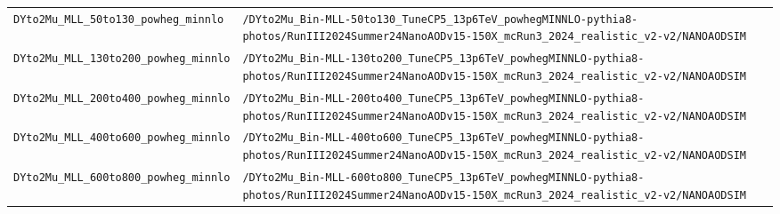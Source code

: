 \begin{longtable}{@{}>{\RaggedRight\arraybackslash}p{} >{\RaggedRight\arraybackslash}p{}@{}}
\addlinespace[2pt]
\texttt{DYto2Mu\_\allowbreak{}MLL\_\allowbreak{}50to130\_\allowbreak{}powheg\_\allowbreak{}minnlo} & \texttt{/\allowbreak{}DYto2Mu\_\allowbreak{}Bin-\allowbreak{}MLL-\allowbreak{}50to130\_\allowbreak{}TuneCP5\_\allowbreak{}13p6TeV\_\allowbreak{}powhegMINNLO-\allowbreak{}pythia8-\allowbreak{}photos/\allowbreak{}RunIII2024Summer24NanoAODv15-\allowbreak{}150X\_\allowbreak{}mcRun3\_\allowbreak{}2024\_\allowbreak{}realistic\_\allowbreak{}v2-\allowbreak{}v2/\allowbreak{}NANOAODSIM} \\
\addlinespace[2pt]
\texttt{DYto2Mu\_\allowbreak{}MLL\_\allowbreak{}130to200\_\allowbreak{}powheg\_\allowbreak{}minnlo} & \texttt{/\allowbreak{}DYto2Mu\_\allowbreak{}Bin-\allowbreak{}MLL-\allowbreak{}130to200\_\allowbreak{}TuneCP5\_\allowbreak{}13p6TeV\_\allowbreak{}powhegMINNLO-\allowbreak{}pythia8-\allowbreak{}photos/\allowbreak{}RunIII2024Summer24NanoAODv15-\allowbreak{}150X\_\allowbreak{}mcRun3\_\allowbreak{}2024\_\allowbreak{}realistic\_\allowbreak{}v2-\allowbreak{}v2/\allowbreak{}NANOAODSIM} \\
\addlinespace[2pt]
\texttt{DYto2Mu\_\allowbreak{}MLL\_\allowbreak{}200to400\_\allowbreak{}powheg\_\allowbreak{}minnlo} & \texttt{/\allowbreak{}DYto2Mu\_\allowbreak{}Bin-\allowbreak{}MLL-\allowbreak{}200to400\_\allowbreak{}TuneCP5\_\allowbreak{}13p6TeV\_\allowbreak{}powhegMINNLO-\allowbreak{}pythia8-\allowbreak{}photos/\allowbreak{}RunIII2024Summer24NanoAODv15-\allowbreak{}150X\_\allowbreak{}mcRun3\_\allowbreak{}2024\_\allowbreak{}realistic\_\allowbreak{}v2-\allowbreak{}v2/\allowbreak{}NANOAODSIM} \\
\addlinespace[2pt]
\texttt{DYto2Mu\_\allowbreak{}MLL\_\allowbreak{}400to600\_\allowbreak{}powheg\_\allowbreak{}minnlo} & \texttt{/\allowbreak{}DYto2Mu\_\allowbreak{}Bin-\allowbreak{}MLL-\allowbreak{}400to600\_\allowbreak{}TuneCP5\_\allowbreak{}13p6TeV\_\allowbreak{}powhegMINNLO-\allowbreak{}pythia8-\allowbreak{}photos/\allowbreak{}RunIII2024Summer24NanoAODv15-\allowbreak{}150X\_\allowbreak{}mcRun3\_\allowbreak{}2024\_\allowbreak{}realistic\_\allowbreak{}v2-\allowbreak{}v2/\allowbreak{}NANOAODSIM} \\
\addlinespace[2pt]
\texttt{DYto2Mu\_\allowbreak{}MLL\_\allowbreak{}600to800\_\allowbreak{}powheg\_\allowbreak{}minnlo} & \texttt{/\allowbreak{}DYto2Mu\_\allowbreak{}Bin-\allowbreak{}MLL-\allowbreak{}600to800\_\allowbreak{}TuneCP5\_\allowbreak{}13p6TeV\_\allowbreak{}powhegMINNLO-\allowbreak{}pythia8-\allowbreak{}photos/\allowbreak{}RunIII2024Summer24NanoAODv15-\allowbreak{}150X\_\allowbreak{}mcRun3\_\allowbreak{}2024\_\allowbreak{}realistic\_\allowbreak{}v2-\allowbreak{}v2/\allowbreak{}NANOAODSIM} \\

\end{longtable}
